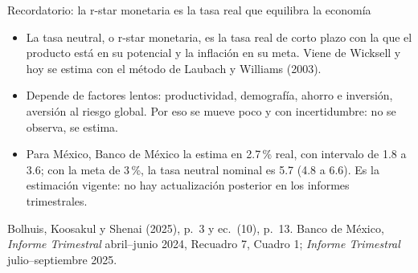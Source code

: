 \documentclass[aspectratio=169,11pt]{beamer}
\newcommand{\fuente}[1]{\par\vfill{\small\color{cGris}#1\par}}
\newcommand{\BKS}{Bolhuis, Koosakul y Shenai (2025)}
\begin{document}
\begin{frame}{Recordatorio: la r-star monetaria es la tasa real que equilibra la economía}
  \begin{itemize}
    \item<1-> La tasa neutral, o r-star monetaria, es la tasa real de corto plazo con la que el producto está en su potencial y la inflación en su meta. Viene de Wicksell y hoy se estima con el método de Laubach y Williams (2003).
    \item<2-> Depende de factores lentos: productividad, demografía, ahorro e inversión, aversión al riesgo global. Por eso se mueve poco y con incertidumbre: no se observa, se estima.
    \item<3-> Para México, Banco de México la estima en 2.7\,\% real, con intervalo de 1.8 a 3.6; con la meta de 3\,\%, la tasa neutral nominal es 5.7 (4.8 a 6.6). Es la estimación vigente: no hay actualización posterior en los informes trimestrales.
  \end{itemize}
  \fuente{\BKS, p.~3 y ec.~(10), p.~13. Banco de México, \emph{Informe Trimestral} abril--junio 2024, Recuadro 7, Cuadro 1; \emph{Informe Trimestral} julio--septiembre 2025.}
\end{frame}
\end{document}
